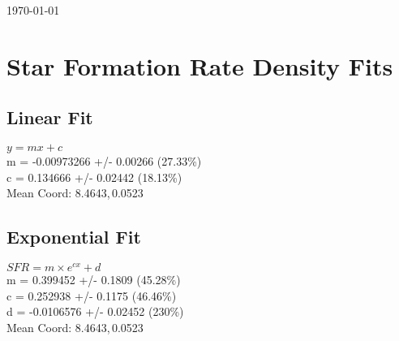 \documentclass{article}
\begin{document}
\small{\today}
\section{Star Formation Rate Density Fits}
	\subsection{Linear Fit}
		\begin{minipage}[h]{0.6\textwidth}
				\begin{center}
					\begingroup{}
		  			\resizebox{\textwidth}{!}{%
						
		  			}\endgroup
				\end{center}
		\end{minipage}
		\begin{minipage}[h]{0.35\textwidth}
			$y = mx + c$ \\
			m               = -0.00973266      +/- 0.00266      (27.33\%) \\
			c               = 0.134666         +/- 0.02442      (18.13\%) \\

			Mean Coord: 8.4643,\,0.0523
		\end{minipage}

	\subsection{Exponential Fit}
		\begin{minipage}[h]{0.6\textwidth}
				\begin{center}
					\begingroup{}
		  			\resizebox{\textwidth}{!}{%
						
		  			}\endgroup
				\end{center}
		\end{minipage}
		\begin{minipage}[h]{0.35\textwidth}
			$SFR = m\times e^{c x} + d$ \\
			m               = 0.399452         +/- 0.1809       (45.28\%) \\
			c               = 0.252938         +/- 0.1175       (46.46\%) \\
			d               = -0.0106576       +/- 0.02452      (230\%) \\

			Mean Coord: 8.4643,\,0.0523
		\end{minipage}
\end{document}
